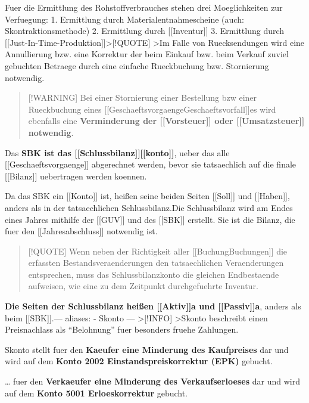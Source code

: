 Fuer die Ermittlung des Rohstoffverbrauches stehen drei Moeglichkeiten zur
Verfuegung: 1. Ermittlung durch Materialentnahmescheine (auch:
Skontraktionsmethode) 2. Ermittlung durch {[}{[}Inventur{]}{]} 3.
Ermittlung durch
{[}{[}Just-In-Time-Produktion{]}{]}\textgreater{[}!QUOTE{]}
\textgreater Im Falle von Ruecksendungen wird eine Annullierung bzw. eine
Korrektur der beim Einkauf bzw. beim Verkauf zuviel gebuchten Betraege
durch eine einfache Rueckbuchung bzw. Stornierung notwendig.

\begin{quote}
{[}!WARNING{]} Bei einer Stornierung einer Bestellung bzw einer
Rueckbuchung eines
{[}{[}Geschaeftsvorgaenge\textbar Geschaeftsvorfall{]}{]}es wird ebenfalls
eine \textbf{Verminderung der {[}{[}Vorsteuer{]}{]} oder
{[}{[}Umsatzsteuer{]}{]} notwendig}.
\end{quote}

Das \textbf{SBK ist das {[}{[}Schlussbilanz{]}{]}{[}{[}konto{]}{]}},
ueber das alle {[}{[}Geschaeftsvorgaenge{]}{]} abgerechnet werden, bevor
sie tatsaechlich auf die finale {[}{[}Bilanz{]}{]} uebertragen werden
koennen.

Da das SBK ein {[}{[}Konto{]}{]} ist, heißen seine beiden Seiten
{[}{[}Soll{]}{]} und {[}{[}Haben{]}{]}, anders als in der tatsaechlichen
Schlussbilanz.Die Schlussbilanz wird am Endes eines Jahres mithilfe der
{[}{[}GUV{]}{]} und des {[}{[}SBK{]}{]} erstellt. Sie ist die Bilanz,
die fuer den {[}{[}Jahresabschluss{]}{]} notwendig ist.

\begin{quote}
{[}!QUOTE{]} Wenn neben der Richtigkeit aller
{[}{[}Buchung\textbar Buchungen{]}{]} die erfassten
Bestandsveraenderungen den tatsaechlichen Veraenderungen entsprechen, muss
das Schlussbilanzkonto die gleichen Endbestaende aufweisen, wie eine zu
dem Zeitpunkt durchgefuehrte Inventur.
\end{quote}

\textbf{Die Seiten der Schlussbilanz heißen {[}{[}Aktiv{]}{]}a und
{[}{[}Passiv{]}{]}a}, anders als beim {[}{[}SBK{]}{]}.--- aliases: -
Skonto --- \textgreater{[}!INFO{]} \textgreater Skonto beschreibt einen
Preisnachlass als ``Belohnung'' fuer besonders fruehe Zahlungen.

Skonto stellt fuer den \textbf{Kaeufer eine Minderung des Kaufpreises} dar
und wird auf dem \textbf{Konto 2002 Einstandspreiskorrektur (EPK)}
gebucht.

\ldots{} fuer den \textbf{Verkaeufer eine Minderung des Verkaufserloeses}
dar und wird auf dem \textbf{Konto 5001 Erloeskorrektur} gebucht.

